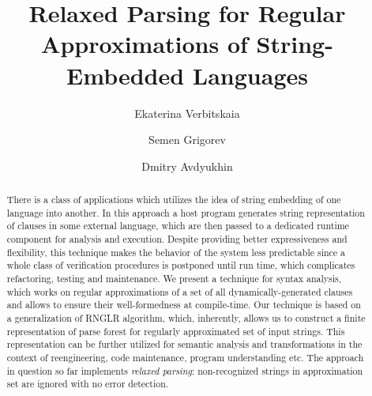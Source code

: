 \documentclass{llncs}
\begin{document}
\frontmatter          %

\pagestyle{headings}  %

\title{Relaxed Parsing for Regular Approximations of String-Embedded Languages}


\author{Ekaterina Verbitskaia \and Semen Grigorev
\and Dmitry Avdyukhin}
%
%


\maketitle              %

\begin{abstract}

There is a class of applications which utilizes the idea of string embedding of one language into
another. In this approach a host program generates string representation of clauses in some external
language, which are then passed to a dedicated runtime component
for analysis and execution. Despite providing better expressiveness and flexibility, this technique
makes the behavior of the system less predictable since a whole class of verification procedures
is postponed until run time, which complicates refactoring, testing and maintenance. We present a
technique for syntax analysis, which works on regular approximations of a set of all dynamically-generated clauses
and allows to ensure their well-formedness at compile-time. Our technique is based on a generalization of RNGLR
algorithm, which, inherently, allows us to construct a finite representation of parse forest for regularly approximated
set of input strings. This representation can be further utilized for semantic analysis and transformations in the context
of reengineering, code maintenance, program understanding etc. The approach in question so far implements
\emph{relaxed parsing}: non-recognized strings in approximation set are ignored with no error detection.
\end{abstract}
\end{document}
